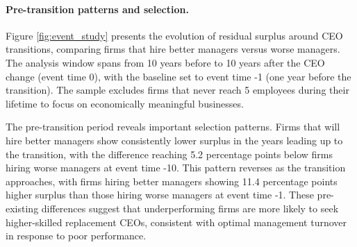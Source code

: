 \documentclass[11pt,a4paper]{article}
\begin{document}
\paragraph{Pre-transition patterns and selection.} Figure \ref{fig:event_study} presents the evolution of residual surplus around CEO transitions, comparing firms that hire better managers versus worse managers. The analysis window spans from 10 years before to 10 years after the CEO change (event time 0), with the baseline set to event time -1 (one year before the transition). The sample excludes firms that never reach 5 employees during their lifetime to focus on economically meaningful businesses.

The pre-transition period reveals important selection patterns. Firms that will hire better managers show consistently lower surplus in the years leading up to the transition, with the difference reaching 5.2 percentage points below firms hiring worse managers at event time -10. This pattern reverses as the transition approaches, with firms hiring better managers showing 11.4 percentage points higher surplus than those hiring worse managers at event time -1. These pre-existing differences suggest that underperforming firms are more likely to seek higher-skilled replacement CEOs, consistent with optimal management turnover in response to poor performance.
\end{document}
